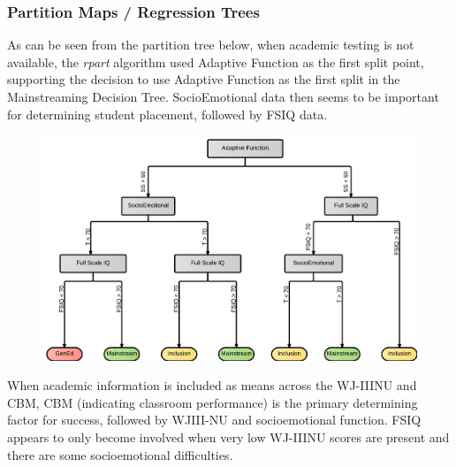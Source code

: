 \documentclass[twoside]{article}
\begin{document}
\subsubsection{Partition Maps  / Regression Trees}
%
As can be seen from the partition tree below, when academic testing is not available, the \textit{rpart} algorithm used Adaptive Function as the first split point, supporting the decision to use Adaptive Function as the first split in the Mainstreaming Decision Tree. SocioEmotional data then seems to be important for determining student placement, followed by FSIQ data.
%
%
%
%
\begin{figure}[htp!]
	\centering
	\includegraphics[width=\textwidth]{RegressionTree_NOAcademics.png}
	\caption[Mainstreaming Decision Tree]{\textit{           }}
	\label{fig1}
\end{figure}
%
%
%
%
When academic information is included as means across the WJ-IIINU and CBM, CBM (indicating classroom performance) is the primary determining factor for success, followed by WJIII-NU and socioemotional function. FSIQ appears to only become involved when very low WJ-IIINU scores are present and there are some socioemotional difficulties.
\end{document}

